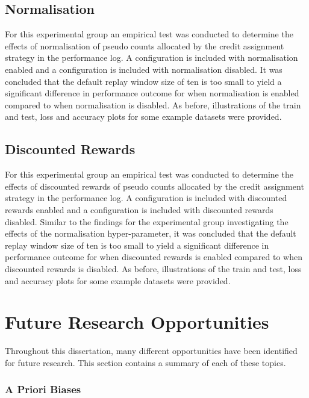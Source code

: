 \subsection{Normalisation}
\label{sec:conclusion:results:summary:normalise}

For this experimental group an empirical test was conducted to determine the effects of normalisation of pseudo counts allocated by the credit assignment strategy in the performance log. A configuration is included with normalisation enabled and a configuration is included with normalisation disabled. It was concluded that the default replay window size of ten is too small to yield a significant difference in performance outcome for when normalisation is enabled compared to when normalisation is disabled. As before, illustrations of the train and test, loss and accuracy plots for some example datasets were provided.

\subsection{Discounted Rewards}
\label{sec:conclusion:results:summary:discounted_rewards}

For this experimental group an empirical test was conducted to determine the effects of discounted rewards of pseudo counts allocated by the credit assignment strategy in the performance log. A configuration is included with discounted rewards enabled and a configuration is included with discounted rewards disabled. Similar to the findings for the experimental group investigating the effects of the normalisation hyper-parameter, it was concluded that the default replay window size of ten is too small to yield a significant difference in performance outcome for when discounted rewards is enabled compared to when discounted rewards is disabled. As before, illustrations of the train and test, loss and accuracy plots for some example datasets were provided.

\section{Future Research Opportunities}
\label{sec:conclusion:further_research}

Throughout this dissertation, many different opportunities have been identified for future research. This section contains a summary of each of these topics.

\subsubsection{A Priori Biases}
\label{sec:conclusion:further_research:a_priori_biases}

